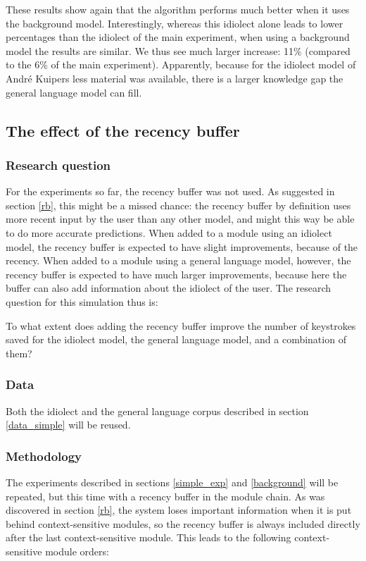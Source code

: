 \documentclass[12pt]{article}
\begin{document}
These results show again that the algorithm performs much better when it uses the background model. Interestingly, whereas this idiolect alone leads to lower percentages than the idiolect of the main experiment, when using a background model the results are similar. We thus see much larger increase: 11\% (compared to the 6\% of the main experiment). Apparently, because for the idiolect model of Andr\'e Kuipers less material was available, there is a larger knowledge gap the general language model can fill.


\subsection{The effect of the recency buffer} \label{recbuf}

\subsubsection{Research question}

For the experiments so far, the recency buffer was not used. As suggested in section \ref{rb}, this might be a missed chance: the recency buffer by definition uses more recent input by the user than any other model, and might this way be able to do more accurate predictions. When added to a module using an idiolect model, the recency buffer is expected to have slight improvements, because of the recency. When added to a module using a general language model, however, the recency buffer is expected to have much larger improvements, because here the buffer can also add information about the idiolect of the user. The research question for this simulation thus is:

\begin{examples}
\item To what extent does adding the recency buffer improve the number of keystrokes saved for the idiolect model, the general language model, and a combination of them?
\end{examples}

\subsubsection{Data}

Both the idiolect and the general language corpus described in section \ref{data_simple} will be reused. 

\subsubsection{Methodology}
The experiments described in sections \ref{simple_exp} and \ref{background} will be repeated, but this time with a recency buffer in the module chain. As was discovered in section \ref{rb}, the system loses important information when it is put behind context-sensitive modules, so the recency buffer is always included directly after the last context-sensitive module. This leads to the following context-sensitive module orders:
\end{document}
